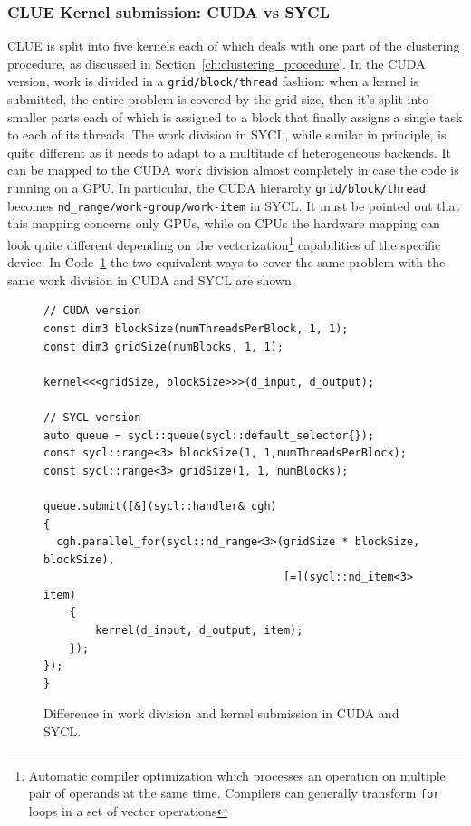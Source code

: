 \subsubsection{CLUE Kernel submission: CUDA vs SYCL}
CLUE is split into five kernels each of which deals with one part of the clustering procedure, as discussed in Section~\ref{ch:clustering_procedure}. In the CUDA version, work is divided in a \texttt{grid/block/thread} fashion: when a kernel is submitted, the entire problem is covered by the grid size, then it's split into smaller parts each of which is assigned to a block that finally assigns a single task to each of its threads. The work division in SYCL, while similar in principle, is quite different as it needs to adapt to a multitude of heterogeneous backends. It can be mapped to the CUDA work division almost completely in case the code is running on a GPU. In particular, the CUDA hierarchy \texttt{grid/block/thread} becomes \texttt{nd\_range/work-group/work-item} in SYCL. It must be pointed out that this mapping concerns only GPUs, while on CPUs the hardware mapping can look quite different depending on the vectorization\footnote{Automatic compiler optimization which processes an operation on multiple pair of operands at the same time. Compilers can generally transform \texttt{for} loops in a set of vector operations} capabilities of the specific device.
In Code~\ref{code:kernel_submission} the two equivalent ways to cover the same problem with the same work division in CUDA and SYCL are shown.

\begin{figure}[ht!]
\renewcommand{\figurename}{Code}
\begin{verbatim}
// CUDA version
const dim3 blockSize(numThreadsPerBlock, 1, 1);
const dim3 gridSize(numBlocks, 1, 1);
 
kernel<<<gridSize, blockSize>>>(d_input, d_output);

// SYCL version
auto queue = sycl::queue(sycl::default_selector{});
const sycl::range<3> blockSize(1, 1,numThreadsPerBlock);
const sycl::range<3> gridSize(1, 1, numBlocks);

queue.submit([&](sycl::handler& cgh) 
{
  cgh.parallel_for(sycl::nd_range<3>(gridSize * blockSize, blockSize), 
                                     [=](sycl::nd_item<3> item)
    {
        kernel(d_input, d_output, item);
    });
});
}
\end{verbatim}
\caption{Difference in work division and kernel submission in CUDA and SYCL.}
\label{code:kernel_submission}
\end{figure}

